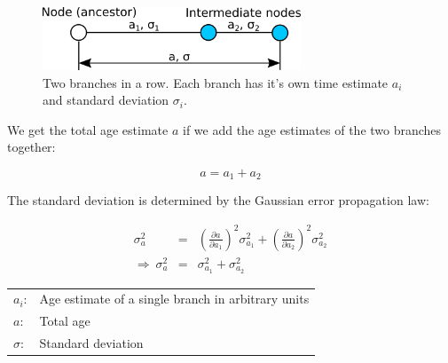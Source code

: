 \begin{figure}[ht]
\centering
\includegraphics[width=7.7cm]{img/nodes_in_row.png}
\caption{\label{nodes_in_row} Two branches in a row.
Each branch has it's own time estimate
$a_i$ and standard deviation $\sigma_i$.}
\end{figure}

We get the total age estimate $a$ if we add the age estimates
of the two branches together:

\begin{equation}
a = a_1 + a_2
\end{equation}

The standard deviation is determined by the Gaussian error
propagation law:

\begin{eqnarray}
\sigma_a^2 & = & \left( \frac{\partial a}{\partial a_1} \right)^2 \sigma_{a_1}^2
+ \left( \frac{\partial a}{\partial a_2} \right)^2 \sigma_{a_2}^2\\
\Rightarrow\ \sigma_a^2 & = & \sigma_{a_1}^2 + \sigma_{a_2}^2
\end{eqnarray}

\begin{tabular}{ll}
$a_i$: &  Age estimate of a single branch in arbitrary units\\
$a$: & Total age\\
$\sigma$: &  Standard deviation
\end{tabular}
\vspace{1em}










